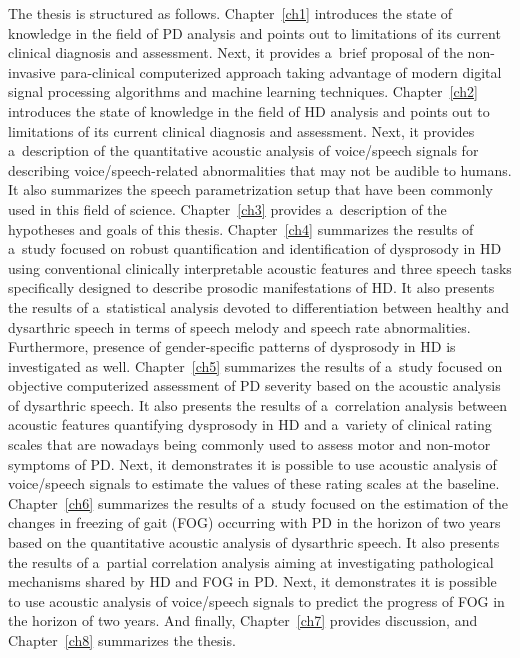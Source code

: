 The thesis is structured as follows. Chapter~\ref{ch1} introduces the state of knowledge in the field of PD analysis and points out to limitations of its current clinical diagnosis and assessment. Next, it provides a~brief proposal of the non-invasive para-clinical computerized approach taking advantage of modern digital signal processing algorithms and machine learning techniques. Chapter~\ref{ch2} introduces the state of knowledge in the field of HD analysis and points out to limitations of its current clinical diagnosis and assessment. Next, it provides a~description of the quantitative acoustic analysis of voice/speech signals for describing voice/speech-related abnormalities that may not be audible to humans. It also summarizes the speech parametrization setup that have been commonly used in this field of science. Chapter~\ref{ch3} provides a~description of the hypotheses and goals of this thesis. Chapter~\ref{ch4} summarizes the results of a~study focused on robust quantification and identification of dysprosody in HD using conventional clinically interpretable acoustic features and three speech tasks specifically designed to describe prosodic manifestations of HD. It also presents the results of a~statistical analysis devoted to differentiation between healthy and dysarthric speech in terms of speech melody and speech rate abnormalities. Furthermore, presence of gender-specific patterns of dysprosody in HD is investigated as well. Chapter~\ref{ch5} summarizes the results of a~study focused on objective computerized assessment of PD severity based on the acoustic analysis of dysarthric speech. It also presents the results of a~correlation analysis between acoustic features quantifying dysprosody in HD and a~variety of clinical rating scales that are nowadays being commonly used to assess motor and non-motor symptoms of PD. Next, it demonstrates it is possible to use acoustic analysis of voice/speech signals to estimate the values of these rating scales at the baseline. Chapter~\ref{ch6} summarizes the results of a~study focused on the estimation of the changes in freezing of gait (FOG) occurring with PD in the horizon of two years based on the quantitative acoustic analysis of dysarthric speech. It also presents the results of a~partial correlation analysis aiming at investigating pathological mechanisms shared by HD and FOG in PD. Next, it demonstrates it is possible to use acoustic analysis of voice/speech signals to predict the progress of FOG in the horizon of two years. And finally, Chapter~\ref{ch7} provides discussion, and Chapter~\ref{ch8} summarizes the thesis.